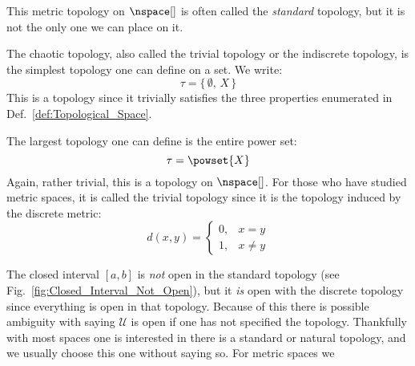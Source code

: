 \documentclass[oneside]{book}                                                  %
\begin{document}
                This metric topology on $\nspace[]$ is often called the
                \textit{standard} topology, but it is not the only one we can
                place on it.
                \begin{example}
                    The chaotic topology, also called the trivial topology or
                    the indiscrete topology, is the simplest topology one can
                    define on a set. We write:
                    \begin{equation}
                        \tau=\{\,\emptyset,\,X\,\}
                    \end{equation}
                    This is a topology since it trivially satisfies the three
                    properties enumerated in Def.~\ref{def:Topological_Space}.
                \end{example}
                \begin{example}
                    The largest topology one can define is the entire power set:
                    \begin{equation}
                        \tau=\powset{X}
                    \end{equation}
                    Again, rather trivial, this is a topology on $\nspace[]$.
                    For those who have studied metric spaces, it is called the
                    trivial topology since it is the topology induced by the
                    discrete metric:
                    \begin{equation}
                        d(x,y)=
                        \begin{cases}
                            0,&x=y\\
                            1,&x\ne{y}
                        \end{cases}
                    \end{equation}
                \end{example}
                The closed interval $[a,b]$ is \textit{not} open in the standard
                topology (see Fig.~\ref{fig:Closed_Interval_Not_Open}), but it
                \textit{is} open with the discrete topology since everything is
                open in that topology. Because of this there is possible
                ambiguity with saying $\mathcal{U}$ is open if one has not
                specified the topology. Thankfully with most spaces one is
                interested in there is a standard or natural topology, and we
                usually choose this one without saying so. For metric spaces we
\end{document}
